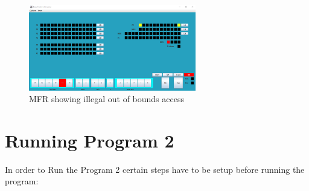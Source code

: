 \documentclass[10pt]{article}
\begin{document}
\begin{figure}[H]
  \centering
  \includegraphics[width=0.65\textwidth]{Pics/Fig16.png}
  \caption{MFR showing illegal out of bounds access}
  \label{fig:MFRDemo}
\end{figure}
\section{Running Program 2}
In order to Run the Program 2 certain steps have to be setup before running the program:
\end{document}
